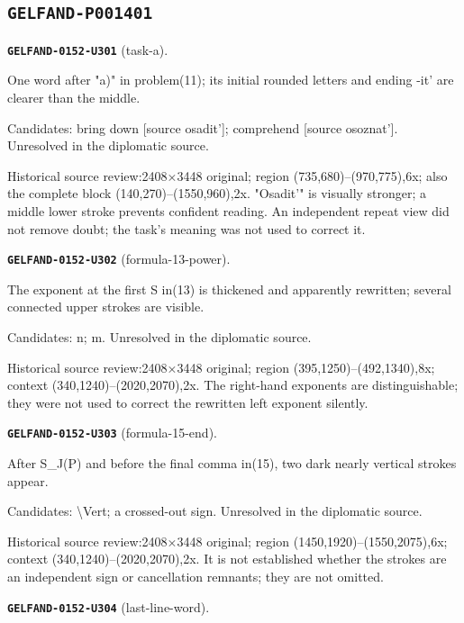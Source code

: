 \subsection*{\texttt{GELFAND-P001401}}
\par\noindent\leavevmode{}\label{GELFAND-0152-U301}\textbf{\texttt{GELFAND-0152-U301}} (task-a).\nopagebreak[4]\par
One word after "a)" in problem(11); its initial rounded letters and ending -it' are clearer than the middle.\par
Candidates: bring down [source osadit']; comprehend [source osoznat']. Unresolved in the diplomatic source.\par
Historical source review:2408×3448 original; region (735,680)–(970,775),6x; also the complete block (140,270)–(1550,960),2x. "Osadit'" is visually stronger; a middle lower stroke prevents confident reading. An independent repeat view did not remove doubt; the task's meaning was not used to correct it.\par\medskip
\par\noindent\leavevmode{}\label{GELFAND-0152-U302}\textbf{\texttt{GELFAND-0152-U302}} (formula-13-power).\nopagebreak[4]\par
The exponent at the first S in(13) is thickened and apparently rewritten; several connected upper strokes are visible.\par
Candidates: n; m. Unresolved in the diplomatic source.\par
Historical source review:2408×3448 original; region (395,1250)–(492,1340),8x; context (340,1240)–(2020,2070),2x. The right-hand exponents are distinguishable; they were not used to correct the rewritten left exponent silently.\par\medskip
\par\noindent\leavevmode{}\label{GELFAND-0152-U303}\textbf{\texttt{GELFAND-0152-U303}} (formula-15-end).\nopagebreak[4]\par
After S\_J(P) and before the final comma in(15), two dark nearly vertical strokes appear.\par
Candidates: \textbackslash{}Vert; a crossed-out sign. Unresolved in the diplomatic source.\par
Historical source review:2408×3448 original; region (1450,1920)–(1550,2075),6x; context (340,1240)–(2020,2070),2x. It is not established whether the strokes are an independent sign or cancellation remnants; they are not omitted.\par\medskip
\par\noindent\leavevmode{}\label{GELFAND-0152-U304}\textbf{\texttt{GELFAND-0152-U304}} (last-line-word).\nopagebreak[4]\par
